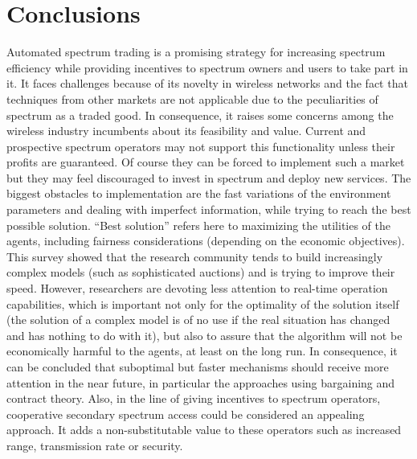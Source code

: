 \section{Conclusions}
\label{sec:Conclusions}

Automated spectrum trading is a promising strategy for increasing spectrum efficiency while providing incentives to spectrum owners and users to take part in it.
It faces challenges because of its novelty in wireless networks and the fact that techniques from other markets are not applicable due to the peculiarities of spectrum as a traded good.
In consequence, it raises some concerns among the wireless industry incumbents about its feasibility and value.
Current and prospective spectrum operators may not support this functionality unless their profits are guaranteed. Of course they can be forced to implement such a market but they may feel discouraged to invest in spectrum and deploy new services. The biggest obstacles to implementation are the fast variations of the environment parameters and dealing with imperfect information, while trying to reach the best possible solution. ``Best solution'' refers here to maximizing the utilities of the agents, including fairness considerations (depending on the economic objectives). 
This survey showed that the research community tends to build increasingly complex models (such as sophisticated auctions) and is trying to improve their speed. However, researchers are devoting less attention to real-time operation capabilities, which is important not only for the optimality of the solution itself (the solution of a complex model is of no use if the real situation has changed and has nothing to do with it), but also to assure that the algorithm will not be economically harmful to the agents, at least on the long run. In consequence, it can be concluded that suboptimal but faster mechanisms should receive more attention in the near future, in particular the approaches using bargaining and contract theory. 
Also, in the line of giving incentives to spectrum operators, cooperative secondary spectrum access could be considered an appealing approach. It adds a non-substitutable value to these operators such as increased range, transmission rate or security.
